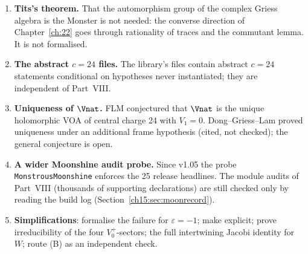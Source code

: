 \begin{enumerate}
  stated through series defined by their logarithmic derivatives (Chapter~\ref{ch:19}); neither the exponential form nor
  the product form with roots of unity is a Lean statement, and the comparison of  with literal finite
  products was not written.
\item \textbf{Tits's theorem.} That the automorphism group of the complex Griess algebra is the Monster is not
  needed: the converse direction of Chapter~\ref{ch:22} goes through rationality of traces and the commutant lemma. It is
  not formalised.
\item \textbf{The abstract $c=24$ files.} The library's  files contain abstract $c=24$
  statements conditional on hypotheses never instantiated; they are independent of Part~VIII.
\item \textbf{Uniqueness of $\Vnat$.} FLM conjectured that $\Vnat$ is the unique holomorphic VOA of
  central charge 24 with $V_1=0$. Dong--Griess--Lam proved uniqueness under an additional frame
  hypothesis (cited, not checked); the general conjecture is open.
\item \textbf{A wider Moonshine audit probe.} Since v1.05 the probe \texttt{MonstrousMoonshine} enforces the 25
  release headlines. The module audits of Part~VIII (thousands of supporting declarations) are still checked only by
  reading the build log (Section~\ref{ch15:sec:moonrecord}).
\item \textbf{Simplifications}: formalise the failure for $\varepsilon=-1$; make  explicit;
  prove irreducibility of the four $V_0^+$-sectors; the full intertwining Jacobi identity for $W$;
  route (B) as an independent check.
\end{enumerate}

